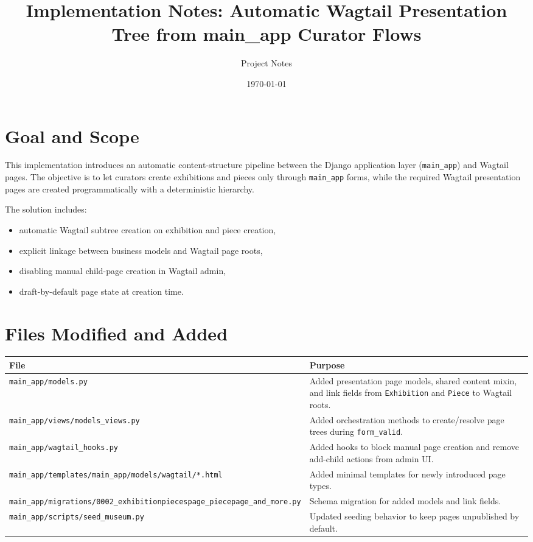 \documentclass[11pt,a4paper]{article}
\title{Implementation Notes: Automatic Wagtail Presentation Tree from main\_app Curator Flows}
\author{Project Notes}
\date{\today}
\begin{document}
\maketitle

\section{Goal and Scope}
This implementation introduces an automatic content-structure pipeline between the Django application layer (\texttt{main\_app}) and Wagtail pages. The objective is to let curators create exhibitions and pieces only through \texttt{main\_app} forms, while the required Wagtail presentation pages are created programmatically with a deterministic hierarchy.

The solution includes:
\begin{itemize}[leftmargin=*]
    \item automatic Wagtail subtree creation on exhibition and piece creation,
    \item explicit linkage between business models and Wagtail page roots,
    \item disabling manual child-page creation in Wagtail admin,
    \item draft-by-default page state at creation time.
\end{itemize}

\section{Files Modified and Added}
\begin{longtable}{>{\raggedright\arraybackslash}p{} >{\raggedright\arraybackslash}p{}}
\textbf{File} & \textbf{Purpose} \\\hline
\texttt{main\_app/models.py} & Added presentation page models, shared content mixin, and link fields from \texttt{Exhibition} and \texttt{Piece} to Wagtail roots. \\
\texttt{main\_app/views/models\_views.py} & Added orchestration methods to create/resolve page trees during \texttt{form\_valid}. \\
\texttt{main\_app/wagtail\_hooks.py} & Added hooks to block manual page creation and remove add-child actions from admin UI. \\
\texttt{main\_app/templates/main\_app/models/wagtail/*.html} & Added minimal templates for newly introduced page types. \\
\texttt{main\_app/migrations/0002\_exhibitionpiecespage\_piecepage\_and\_more.py} & Schema migration for added models and link fields. \\
\texttt{main\_app/scripts/seed\_museum.py} & Updated seeding behavior to keep pages unpublished by default. \\
\end{longtable}
\end{document}
